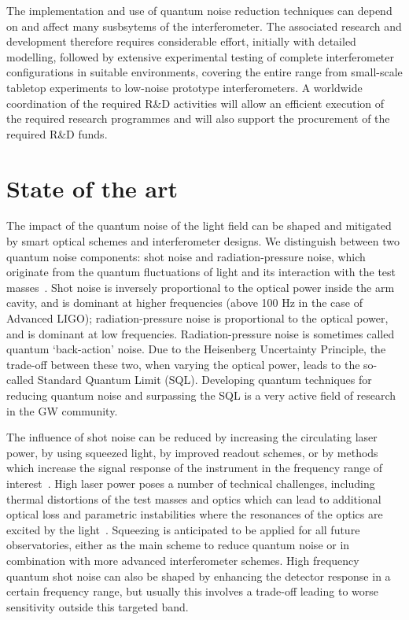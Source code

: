The implementation and use of quantum noise reduction techniques can depend on and affect many susbsytems of the interferometer. The associated research and development therefore requires considerable effort, initially with detailed modelling, followed by extensive experimental testing of complete interferometer configurations in suitable environments, covering the entire range from small-scale tabletop experiments to low-noise prototype interferometers. A worldwide coordination of the required R\&D activities will allow an efficient execution of the required research programmes and will also support the procurement of the required R\&D funds. 
 
\section{State of the art}
The impact of the quantum noise of the light field can be shaped and mitigated by smart optical schemes and interferometer designs. We distinguish between two quantum noise components: shot noise and radiation-pressure noise, which originate from the quantum fluctuations of light and its interaction with the test masses~\cite{Cav1980}. Shot noise is inversely proportional to the optical power inside the arm cavity, and is dominant at higher frequencies (above 100 Hz in the case of Advanced LIGO); radiation-pressure noise is proportional to the optical power, and is dominant at low frequencies. Radiation-pressure noise is sometimes called quantum `back-action' noise. Due to the Heisenberg Uncertainty Principle, the trade-off between these two, when varying the optical power, leads to the so-called Standard Quantum Limit (SQL). Developing quantum techniques for reducing quantum noise and surpassing the SQL is a very active field of research in the GW community. 

The influence of shot noise can be reduced by increasing the circulating laser power, by using squeezed light, by improved readout schemes, or by methods which increase the signal response of the instrument in the frequency range of interest~\cite{StMe1991,Mizuno:RSE1993,Osamu:2006}. High laser power poses a number of technical challenges, including thermal distortions of the test masses and optics which can lead to additional optical loss and parametric instabilities where the resonances of the optics are excited by the light~\cite{BSV2001,Evans:2015raa}. Squeezing is anticipated to be applied for all future observatories, either as the main scheme to reduce quantum noise or in combination with more advanced interferometer schemes. High frequency quantum shot noise can also be shaped by enhancing the detector response in a certain frequency range, but usually this involves a trade-off leading to worse sensitivity outside this targeted band.  

